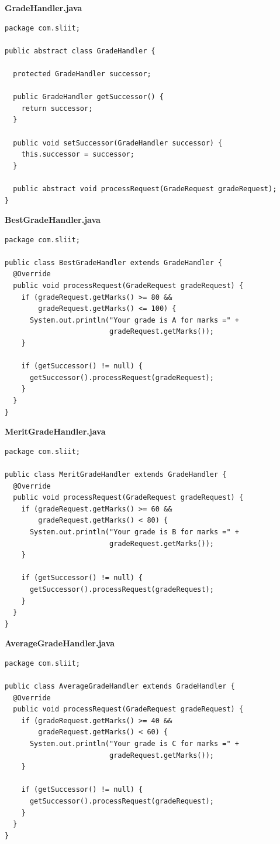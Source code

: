 \documentclass[12pt]{scrartcl} %
\begin{document}
\textbf{GradeHandler.java}
\lstset{language=Java}
\begin{lstlisting}[frame=single]
package com.sliit;

public abstract class GradeHandler {

  protected GradeHandler successor;

  public GradeHandler getSuccessor() {
    return successor;
  }

  public void setSuccessor(GradeHandler successor) {
    this.successor = successor;
  }

  public abstract void processRequest(GradeRequest gradeRequest);
}

\end{lstlisting}

\textbf{BestGradeHandler.java}
\lstset{language=Java}
\begin{lstlisting}[frame=single]
package com.sliit;

public class BestGradeHandler extends GradeHandler {
  @Override
  public void processRequest(GradeRequest gradeRequest) {
    if (gradeRequest.getMarks() >= 80 && 
        gradeRequest.getMarks() <= 100) {
      System.out.println("Your grade is A for marks =" + 
                         gradeRequest.getMarks());
    }

    if (getSuccessor() != null) {
      getSuccessor().processRequest(gradeRequest);
    }
  }
}

\end{lstlisting}

\textbf{MeritGradeHandler.java}
\lstset{language=Java}
\begin{lstlisting}[frame=single]
package com.sliit;

public class MeritGradeHandler extends GradeHandler {
  @Override
  public void processRequest(GradeRequest gradeRequest) {
    if (gradeRequest.getMarks() >= 60 && 
        gradeRequest.getMarks() < 80) {
      System.out.println("Your grade is B for marks =" + 
                         gradeRequest.getMarks());
    }

    if (getSuccessor() != null) {
      getSuccessor().processRequest(gradeRequest);
    }
  }
}

\end{lstlisting}


\textbf{AverageGradeHandler.java}
\lstset{language=Java}
\begin{lstlisting}[frame=single]
package com.sliit;

public class AverageGradeHandler extends GradeHandler {
  @Override
  public void processRequest(GradeRequest gradeRequest) {
    if (gradeRequest.getMarks() >= 40 && 
        gradeRequest.getMarks() < 60) {
      System.out.println("Your grade is C for marks =" + 
                         gradeRequest.getMarks());
    }

    if (getSuccessor() != null) {
      getSuccessor().processRequest(gradeRequest);
    }
  }
}
\end{lstlisting}
\end{document}
